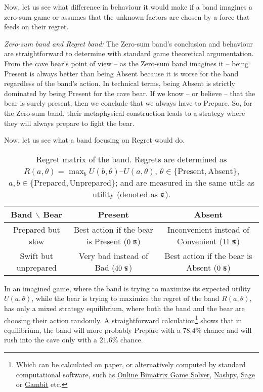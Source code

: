 \documentclass{article}
\newcommand{\util}{\scalebox{0.75}{\text{\Pfund}}}
\begin{document}
Now, let us see what difference in behaviour it would make if a band imagines a zero-sum game or assumes that the unknown factors are chosen by a force that feeds on their regret.

{\it Zero-sum band and Regret band:}
The Zero-sum band's conclusion and behaviour are straightforward to determine with standard game theoretical argumentation.
From the cave bear’s point of view -- as the Zero-sum band imagines it -- being Present is always better than being Absent because it is worse for the band regardless of the band's action. In technical terms, being Absent is strictly dominated by being Present for the cave bear.
If we know – or believe – that the bear is surely present, then we conclude that we always have to Prepare. So, for the Zero-sum band, their metaphysical construction leads to a strategy where they will always prepare to fight the bear.

Now, let us see what a band focusing on Regret would do.

\begin{table}[h!]
    \centering
    \begin{tabular}{c|cc}
        Band $\backslash$ Bear & Present & Absent \\
        \hline
        Prepared but slow & Best action if the bear is Present ($0\ \util$) & Inconvenient instead of Convenient ($11\ \util$) \\
        Swift but unprepared & Very bad instead of Bad ($40\ \util$) & Best action if the bear is Absent ($0\ \util$) \\
    \end{tabular}
    \caption{Regret matrix of the band. Regrets are determined as $R(a,\theta) = \max_{b} U(b,\theta) – U(a,\theta)$, \mbox{$\theta \in \{\mathrm{Present},\mathrm{Absent}\}$}, \mbox{$a,b \in \{\mathrm{Prepared},\mathrm{Unprepared}\}$}; and are measured in the same utils as utility (denoted as $\util$).}
    \label{tab:BandBearRegretMatrix}
\end{table}

In an imagined game, where the band is trying to maximize its expected utility $U(a,\theta)$, while the bear is trying to maximize the regret of the band $R(a,\theta)$, has only a mixed strategy equilibrium, where both the band and the bear are choosing their action randomly.
A straightforward calculation\footnote{Which can be calculated on paper, or alternatively computed by standard computational software, such as \href{https://cgi.csc.liv.ac.uk/~rahul/bimatrix_solver/}{Online Bimatrix Game Solver}, \href{https://nashpy.readthedocs.io/en/stable/}{Nashpy}, \href{https://doc.sagemath.org/html/en/reference/game_theory/index.html}{Sage} or \href{https://gambitproject.readthedocs.io/en/latest/intro.html}{Gambit} etc.} shows that in equilibrium, the band will more probably Prepare with a $78.4\%$ chance and will rush into the cave only with a $21.6\%$ chance.
\end{document}
